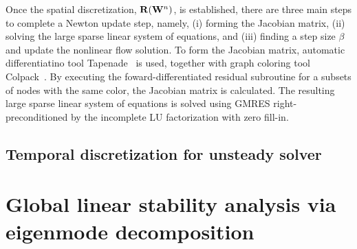 \documentclass[journal,final]{new-aiaa}
\begin{document}
Once the spatial discretization,  $\mathbf{R}(\mathbf{W}^n)$, is established,
there are three main steps to complete a Newton update step,
namely, (i) forming the Jacobian matrix, (ii)
solving the large sparse linear system of equations,
and (iii) finding a step size $\beta$ and update the nonlinear
flow solution.
To form the Jacobian matrix, automatic differentiatino tool Tapenade~\cite{Tapenade}
is used, together with graph coloring tool Colpack~\cite{gebremedhin2013colpack}.
By executing the
foward-differentiated residual subroutine for a subsets of nodes
with the same color, the Jacobian matrix is calculated. The resulting
large sparse linear system of equations is solved using GMRES
right-preconditioned by the incomplete LU factorization with zero
fill-in. 

\subsection{Temporal discretization for unsteady solver}




\section{Global linear stability analysis via eigenmode decomposition}
\label{label:sec2}
\end{document}
